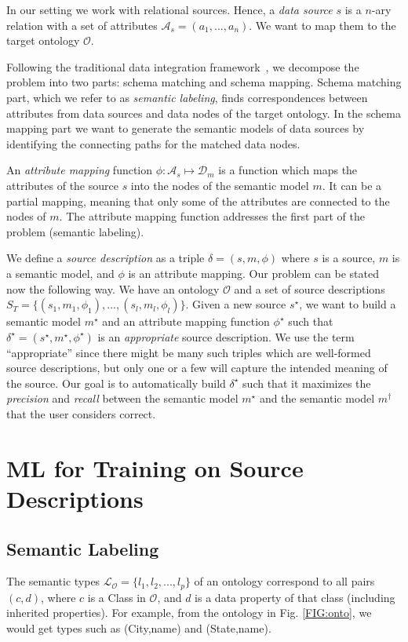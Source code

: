 \documentclass[letterpaper]{article} %
\newcommand{\authornote}[3]{
  {\fbox{\sc 
  #1}:$\blacktriangleright$\textcolor{#2}{\small{#3}}$\blacktriangleleft$}%
}
\newcommand{\npr}[1]{\authornote{NPR}{orange}{#1}}
\begin{document}
In our setting we work with relational sources.
Hence, a \emph{data source} $s$ is a $n$-ary relation with a set of attributes 
$\mathcal{A}_s = (a_1,...,a_n)$.
We want to map them to the target ontology $\mathcal{O}$.

Following the traditional data integration framework~\cite{doan2012principles}, we decompose the problem into two parts: schema matching and schema mapping.
Schema matching part, which we refer to as \emph{semantic labeling}, finds correspondences between attributes from data sources and data nodes of the target ontology.
In the schema mapping part we want to generate the semantic models of data sources by identifying the connecting paths for the matched data nodes.

An \emph{attribute mapping} function $\phi : \mathcal{A}_s \mapsto 
\mathcal{D}_m$ is a function which maps the attributes of the source $s$ into the nodes of the semantic model $m$. 
It can be a partial mapping, meaning that only some of the attributes
are connected to the nodes of $m$.
The attribute mapping function addresses the first part of the problem (semantic labeling).

We define a \emph{source description} as a triple $\delta = (s, m, \phi)$ where $s$ is a source, $m$ is a semantic model, and $\phi$ is an attribute mapping.
Our problem can be stated now the following way. We have an ontology 
$\mathcal{O}$ and a set of source descriptions $S_T = \{(s_1, m_1, \phi_1),..., 
(s_l, m_l, \phi_l)\}$.
Given a new source $s^\star$, we want to build a semantic model $m^\star$ and an attribute mapping function $\phi^\star$ such that 
$\delta^\star = (s^\star,m^\star,\phi^\star)$ is an \emph{appropriate} source description. 
We use the term ``appropriate'' since there might be many such triples which are well-formed source descriptions, 
but only one or a few will capture the intended meaning of the source. 
Our goal is to automatically build $\delta^\star$ such that it maximizes the \emph{precision} and \emph{recall} between the semantic model 
$m^\star$ and the semantic model $m^\dag$ that the user considers correct. 


\section{ML for Training on Source Descriptions \label{SEC:ML}}


\subsection{Semantic Labeling}
The semantic types $\mathcal{L_O} = \{l_1, l_2, ..., l_p\}$ of an ontology 
correspond to all pairs $(c,d)$, where $c$ is a Class in $\mathcal{O}$, and $d$ 
is a data property of that class (including inherited properties). 
For example, from the ontology in Fig. \ref{FIG:onto}, we would get types such 
as 
(City,name) and (State,name).
\end{document}
